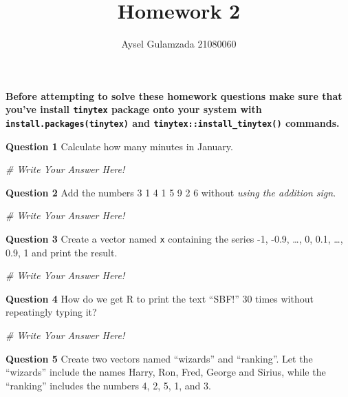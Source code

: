 \documentclass[
]{article}
\title{Homework 2}
\author{Aysel Gulamzada 21080060}
\date{}
\newenvironment{Shaded}{\begin{snugshade}}{\end{snugshade}}
\newcommand{\CommentTok}[1]{\textcolor[rgb]{0.56,0.35,0.01}{\textit{#1}}}
\begin{document}
\maketitle

\textbf{Before attempting to solve these homework questions make sure
that you've install \texttt{tinytex} package onto your system with
\texttt{install.packages(tinytex)} and
\texttt{tinytex::install\_tinytex()} commands.}

\vspace{1cm}

\textbf{Question 1} Calculate how many minutes in January.

\begin{Shaded}
\begin{Highlighting}[]
\CommentTok{\# Write Your Answer Here!}
\end{Highlighting}
\end{Shaded}

\textbf{Question 2} Add the numbers 3 1 4 1 5 9 2 6 without \emph{using
the addition sign}.

\begin{Shaded}
\begin{Highlighting}[]
\CommentTok{\# Write Your Answer Here!}
\end{Highlighting}
\end{Shaded}

\textbf{Question 3} Create a vector named \texttt{x} containing the
series -1, -0.9, \ldots, 0, 0.1, \ldots, 0.9, 1 and print the result.

\begin{Shaded}
\begin{Highlighting}[]
\CommentTok{\# Write Your Answer Here!}
\end{Highlighting}
\end{Shaded}

\textbf{Question 4} How do we get R to print the text ``SBF!'' 30 times
without repeatingly typing it?

\begin{Shaded}
\begin{Highlighting}[]
\CommentTok{\# Write Your Answer Here!}
\end{Highlighting}
\end{Shaded}

\textbf{Question 5} Create two vectors named ``wizards'' and
``ranking''. Let the ``wizards'' include the names Harry, Ron, Fred,
George and Sirius, while the ``ranking'' includes the numbers 4, 2, 5,
1, and 3.
\end{document}
